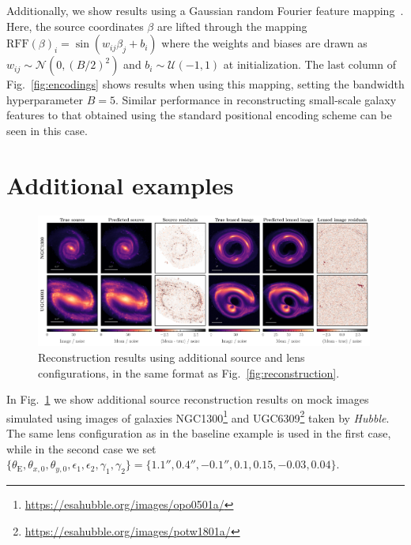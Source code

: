 \documentclass[nohyperref]{article}
\theoremstyle{plain}
\theoremstyle{definition}
\theoremstyle{remark}
\begin{document}
Additionally, we show results using a Gaussian random Fourier feature mapping~\cite{tancik2020fourier,rahimi2007random,yang2022overcoming}. Here, the source coordinates $\beta$ are lifted through the mapping $\mathrm{RFF}(\beta)_i =\sin (w_{ij}\beta_j + b_i)$ where the weights and biases are drawn as $w_{ij}\sim\mathcal N\left(0, (B/2)^2\right)$ and $b_i \sim \mathcal U(-1, 1)$ at initialization. The last column of Fig.~\ref{fig:encodings} shows results when using this mapping, setting the bandwidth hyperparameter $B=5$. Similar performance in reconstructing small-scale galaxy features to that obtained using the standard positional encoding scheme can be seen in this case.

\section{Additional examples}
\label{app:additional}

\begin{figure}[t]
\centering
\includegraphics[width=0.99\textwidth]{figures/reconstruction_sources.pdf}
\caption{Reconstruction results using additional source and lens configurations, in the same format as Fig.~\ref{fig:reconstruction}.}
\label{fig:reconstruction_additional}
\end{figure}

In Fig.~\ref{fig:reconstruction_additional} we show additional source reconstruction results on mock images simulated using images of galaxies NGC1300\footnote{\url{https://esahubble.org/images/opo0501a/}} and UGC6309\footnote{\url{https://esahubble.org/images/potw1801a/}} taken by \emph{Hubble}. The same lens configuration as in the baseline example is used in the first case, while in the second case we set $\{\theta_\mathrm{E}, \theta_{x,0}, \theta_{y,0}, \epsilon_1, \epsilon_2, \gamma_1, \gamma_2\} = \{1.1'', 0.4'', -0.1'', 0.1, 0.15, -0.03, 0.04\}$.
\end{document}
